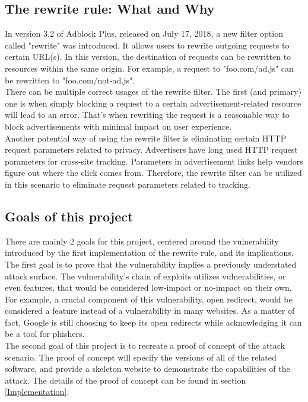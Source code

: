 \documentclass[conference]{IEEEtran}
\begin{document}
\subsection{The rewrite rule: What and Why}
In version 3.2 of Adblock Plus, released on July 17, 2018, a new filter option called "rewrite" was introduced. It allows users to rewrite outgoing requests to certain URL(s). In this version, the destination of requests can be rewritten to resources within the same origin. For example, a request to "foo.com/ad.js" can be rewritten to "foo.com/not-ad.js". \\
There can be multiple correct usages of the rewrite filter. The first (and primary) one is when simply blocking a request to a certain advertisement-related resource will lead to an error. That's when rewriting the request is a reasonable way to block advertisements with minimal impact on user experience. \\
Another potential way of using the rewrite filter is eliminating certain HTTP request parameters related to privacy. Advertisers have long used HTTP request parameters for cross-site tracking. Parameters in advertisement links help vendors figure out where the click comes from. Therefore, the rewrite filter can be utilized in this scenario to eliminate request parameters related to tracking. \\

\subsection{Goals of this project}
There are mainly 2 goals for this project, centered around the vulnerability introduced by the first implementation of the rewrite rule, and its implications. \\
The first goal is to prove that the vulnerability implies a previously understated attack surface. The vulnerability's chain of exploits utilizes vulnerabilities, or even features, that would be considered low-impact or no-impact on their own. For example, a crucial component of this vulnerability, open redirect, would be considered a feature instead of a vulnerability in many websites. As a matter of fact, Google is still choosing to keep its open redirects while acknowledging it can be a tool for phishers.\cite{noauthor_open_nodate} \\
The second goal of this project is to recreate a proof of concept of the attack scenario. The proof of concept will specify the versions of all of the related software, and provide a skeleton website to demonstrate the capabilities of the attack. The details of the proof of concept can be found in section \ref{Implementation}.\\
\end{document}
